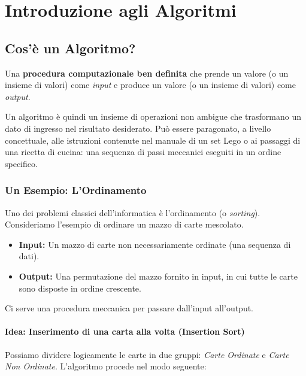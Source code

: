 \documentclass[openany,a4paper,12pt]{book}
\begin{document}
\chapter{Introduzione agli Algoritmi}

\section{Cos'è un Algoritmo?}

\begin{definizione}
Una \textbf{procedura computazionale ben definita} che prende un valore (o un insieme di valori) come \textit{input} e produce un valore (o un insieme di valori) come \textit{output}.
\end{definizione}

Un algoritmo è quindi un insieme di operazioni non ambigue che trasformano un dato di ingresso nel risultato desiderato. Può essere paragonato, a livello concettuale, alle istruzioni contenute nel manuale di un set Lego o ai passaggi di una ricetta di cucina: una sequenza di passi meccanici eseguiti in un ordine specifico.

\subsection*{Un Esempio: L'Ordinamento}

Uno dei problemi classici dell'informatica è l'ordinamento (o \textit{sorting}). Consideriamo l'esempio di ordinare un mazzo di carte mescolato.

\begin{itemize}
    \item \textbf{Input:} Un mazzo di carte non necessariamente ordinate (una sequenza di dati).
    \item \textbf{Output:} Una permutazione del mazzo fornito in input, in cui tutte le carte sono disposte in ordine crescente.
\end{itemize}

Ci serve una procedura meccanica per passare dall'input all'output. 

\subsubsection*{Idea: Inserimento di una carta alla volta (Insertion Sort)}

Possiamo dividere logicamente le carte in due gruppi: \textit{Carte Ordinate} e \textit{Carte Non Ordinate}. L'algoritmo procede nel modo seguente:
\end{document}
